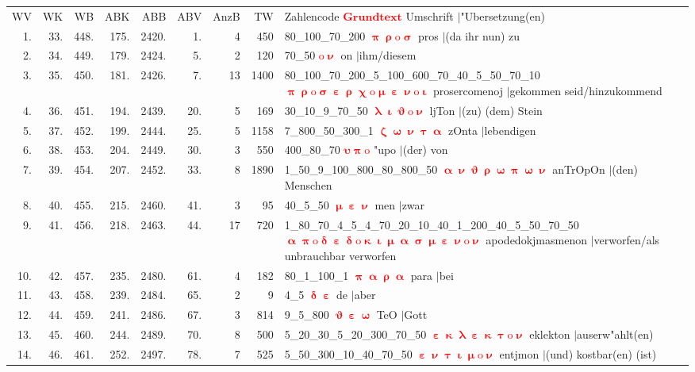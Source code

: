 \documentclass[a4paper,10pt,landscape]{article}
\begin{document}
\begin{tabular}{rrrrrrrrp{120mm}}
WV&WK&WB&ABK&ABB&ABV&AnzB&TW&Zahlencode \textcolor{red}{$\boldsymbol{Grundtext}$} Umschrift $|$"Ubersetzung(en)\\
1.&33.&448.&175.&2420.&1.&4&450&80\_100\_70\_200 \textcolor{red}{$\boldsymbol{\uppi\uprho\mathrm{o}\upsigma}$} pros $|$(da ihr nun) zu\\
2.&34.&449.&179.&2424.&5.&2&120&70\_50 \textcolor{red}{$\boldsymbol{\mathrm{o}\upnu}$} on $|$ihm/diesem\\
3.&35.&450.&181.&2426.&7.&13&1400&80\_100\_70\_200\_5\_100\_600\_70\_40\_5\_50\_70\_10 \textcolor{red}{$\boldsymbol{\uppi\uprho\mathrm{o}\upsigma\upepsilon\uprho\upchi\mathrm{o}\upmu\upepsilon\upnu\mathrm{o}\upiota}$} prosercomenoj $|$gekommen seid/hinzukommend\\
4.&36.&451.&194.&2439.&20.&5&169&30\_10\_9\_70\_50 \textcolor{red}{$\boldsymbol{\uplambda\upiota\upvartheta\mathrm{o}\upnu}$} ljTon $|$(zu) (dem) Stein\\
5.&37.&452.&199.&2444.&25.&5&1158&7\_800\_50\_300\_1 \textcolor{red}{$\boldsymbol{\upzeta\upomega\upnu\uptau\upalpha}$} zOnta $|$lebendigen\\
6.&38.&453.&204.&2449.&30.&3&550&400\_80\_70 \textcolor{red}{$\boldsymbol{\upsilon\uppi\mathrm{o}}$} "upo $|$(der) von\\
7.&39.&454.&207.&2452.&33.&8&1890&1\_50\_9\_100\_800\_80\_800\_50 \textcolor{red}{$\boldsymbol{\upalpha\upnu\upvartheta\uprho\upomega\uppi\upomega\upnu}$} anTrOpOn $|$(den) Menschen\\
8.&40.&455.&215.&2460.&41.&3&95&40\_5\_50 \textcolor{red}{$\boldsymbol{\upmu\upepsilon\upnu}$} men $|$zwar\\
9.&41.&456.&218.&2463.&44.&17&720&1\_80\_70\_4\_5\_4\_70\_20\_10\_40\_1\_200\_40\_5\_50\_70\_50 \textcolor{red}{$\boldsymbol{\upalpha\uppi\mathrm{o}\updelta\upepsilon\updelta\mathrm{o}\upkappa\upiota\upmu\upalpha\upsigma\upmu\upepsilon\upnu\mathrm{o}\upnu}$} apodedokjmasmenon $|$verworfen/als unbrauchbar verworfen\\
10.&42.&457.&235.&2480.&61.&4&182&80\_1\_100\_1 \textcolor{red}{$\boldsymbol{\uppi\upalpha\uprho\upalpha}$} para $|$bei\\
11.&43.&458.&239.&2484.&65.&2&9&4\_5 \textcolor{red}{$\boldsymbol{\updelta\upepsilon}$} de $|$aber\\
12.&44.&459.&241.&2486.&67.&3&814&9\_5\_800 \textcolor{red}{$\boldsymbol{\upvartheta\upepsilon\upomega}$} TeO $|$Gott\\
13.&45.&460.&244.&2489.&70.&8&500&5\_20\_30\_5\_20\_300\_70\_50 \textcolor{red}{$\boldsymbol{\upepsilon\upkappa\uplambda\upepsilon\upkappa\uptau\mathrm{o}\upnu}$} eklekton $|$auserw"ahlt(en)\\
14.&46.&461.&252.&2497.&78.&7&525&5\_50\_300\_10\_40\_70\_50 \textcolor{red}{$\boldsymbol{\upepsilon\upnu\uptau\upiota\upmu\mathrm{o}\upnu}$} entjmon $|$(und) kostbar(en) (ist)\\
\end{tabular}\medskip \\
\end{document}
